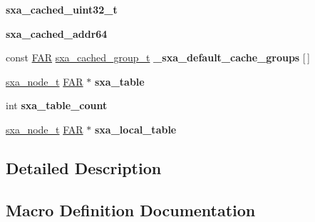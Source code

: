 \begin{DoxyCompactItemize}
\mbox{\label{group___s_x_a_ga138eab92aae0a7afd56d36f4824512c8}} 
{\bfseries sxa\+\_\+cached\+\_\+uint32\+\_\+t}
\item 
\mbox{\label{group___s_x_a_ga7fc067af06a5c045590e9884073b3f98}} 
{\bfseries sxa\+\_\+cached\+\_\+addr64}
\item 
\mbox{\label{group___s_x_a_ga88c9810bd98b37f572f8fb294cb02349}} 
const \hyperlink{group__hal_gaef060b3456fdcc093a7210a762d5f2ed}{F\+AR} \hyperlink{structsxa__cached__group__t}{sxa\+\_\+cached\+\_\+group\+\_\+t} {\bfseries \+\_\+sxa\+\_\+default\+\_\+cache\+\_\+groups} \mbox{[}$\,$\mbox{]}
\item 
\mbox{\label{group___s_x_a_gafaf56c450e4f885ee2d8fd0dfc0bc0a9}} 
\hyperlink{structsxa__node__t}{sxa\+\_\+node\+\_\+t} \hyperlink{group__hal_gaef060b3456fdcc093a7210a762d5f2ed}{F\+AR} $\ast$ {\bfseries sxa\+\_\+table}
\item 
\mbox{\label{group___s_x_a_gaf690fd80428627087e91a1e1b28fad0f}} 
int {\bfseries sxa\+\_\+table\+\_\+count}
\item 
\mbox{\label{group___s_x_a_ga01bfbcf717c18bfb7825eba4715b3ad4}} 
\hyperlink{structsxa__node__t}{sxa\+\_\+node\+\_\+t} \hyperlink{group__hal_gaef060b3456fdcc093a7210a762d5f2ed}{F\+AR} $\ast$ {\bfseries sxa\+\_\+local\+\_\+table}
\end{DoxyCompactItemize}


\subsection{Detailed Description}


\subsection{Macro Definition Documentation}
\mbox{\label{group___s_x_a_gaa0c4e5507161ec6f607d737e4d949a0b}} 
